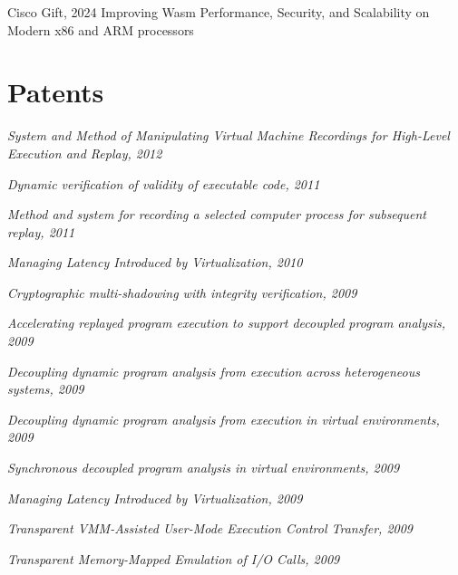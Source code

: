 \begin{resume}
Cisco Gift, 2024
Improving Wasm Performance, Security, and Scalability on Modern x86 and ARM processors




\section{\sc Patents}

{\em System and Method of Manipulating Virtual Machine Recordings for High-Level Execution and Replay, 2012}

{\em Dynamic verification of validity of executable code, 2011}

{\em Method and system for recording a selected computer process for subsequent replay, 2011}

{\em Managing Latency Introduced by Virtualization, 2010}

{\em Cryptographic multi-shadowing with integrity verification, 2009}

{\em Accelerating replayed program execution to support decoupled program analysis, 2009}

{\em Decoupling dynamic program analysis from execution across heterogeneous systems, 2009}

{\em Decoupling dynamic program analysis from execution in virtual environments, 2009}

{\em Synchronous decoupled program analysis in virtual environments, 2009}

{\em Managing Latency Introduced by Virtualization, 2009}

{\em Transparent VMM-Assisted User-Mode Execution Control Transfer, 2009}

{\em Transparent Memory-Mapped Emulation of I/O Calls, 2009}







\end{resume}



